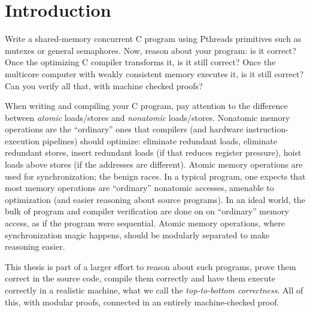 
\chapter{Introduction\label{ch:intro}}

Write a shared-memory concurrent C program using Pthreads primitives such as mutexes or general semaphores. 
Now, reason about your program: is it correct? 
Once the optimizing C compiler transforms it, is it still correct? 
Once the multicore computer with weakly consistent memory executes it, is it still correct? 
Can you verify all that, with machine checked proofs?



When writing and compiling your C program, pay attention to
the difference between \emph{atomic} loads/stores
and \emph{nonatomic} loads/stores.  Nonatomic memory
operations are the ``ordinary'' ones that compilers
(and hardware instruction-execution pipelines)
should optimize:
eliminate redundant loads, eliminate redundant stores,
insert redundant loads (if that reduces register pressure),
hoist loads above stores (if the addresses are different).
Atomic memory operations are used for synchronization; the benign races.  In a typical
program, one expects that most memory operations are ``ordinary''
nonatomic accesses, amenable to optimization (and easier
reasoning about source programs). In an ideal world, the bulk of program and compiler
verification are done on on ``ordinary'' memory access, as if the program were sequential. 
Atomic memory operations, where synchronization magic happens, should be 
modularly separated to make reasoning easier.

This thesis is part of a larger effort to reason about such programs, 
prove them correct  in the source code, compile them correctly and
have them execute correctly in a realistic machine, what we call the 
\emph{top-to-bottom correctness}. All of this, with modular proofs, connected in an entirely
machine-checked proof.  

